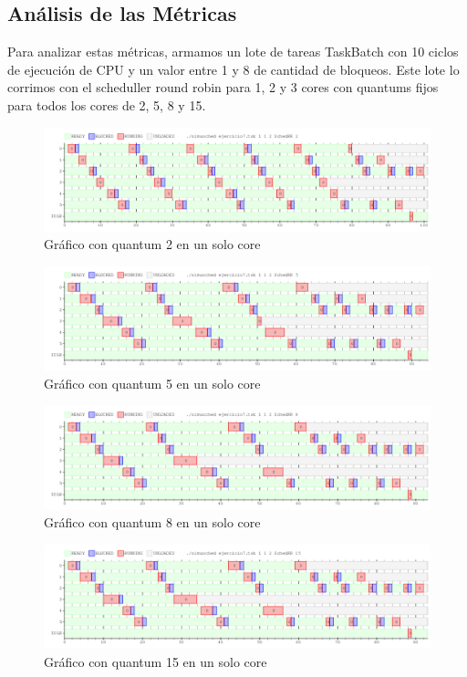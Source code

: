 \documentclass[a4paper,11pt]{article}
\begin{document}
\subsection{Análisis de las Métricas}

Para analizar estas métricas, armamos un lote de tareas TaskBatch con 10 ciclos de ejecución de CPU y un valor entre 1 y 8 de cantidad de bloqueos. Este lote lo corrimos con el scheduller round robin para 1, 2 y 3 cores con quantums fijos para todos los cores de 2, 5, 8 y 15.

\begin{figure}[H]
\centering
\includegraphics[scale=.6, width=1\textwidth]{graficos/ej7-1core-q1}
\caption{Gráfico con quantum 2 en un solo core}
\end{figure}

\begin{figure}[H]
\centering
\includegraphics[scale=.6, width=1\textwidth]{graficos/ej7-1core-q2}
\caption{Gráfico con quantum 5 en un solo core}
\end{figure}

\begin{figure}[H]
\centering
\includegraphics[scale=.6, width=1\textwidth]{graficos/ej7-1core-q3}
\caption{Gráfico con quantum 8 en un solo core}
\end{figure}

\begin{figure}[H]
\centering
\includegraphics[scale=.6, width=1\textwidth]{graficos/ej7-1core-q4}
\caption{Gráfico con quantum 15 en un solo core}
\end{figure}
\end{document}
